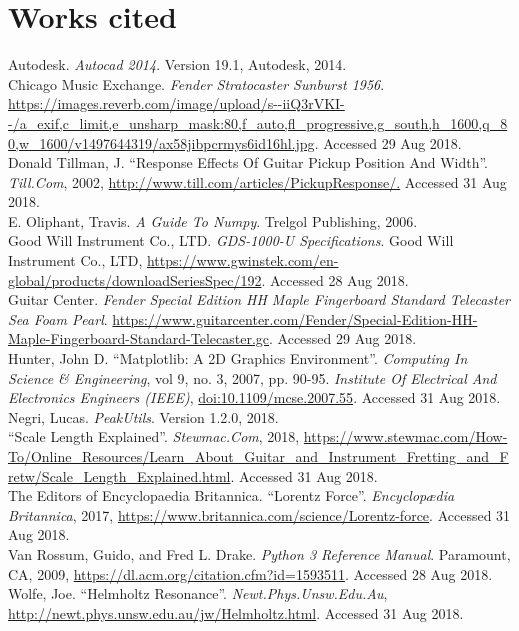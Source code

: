 \documentclass{article}
\begin{document}
\section*{Works cited}
\begin{hangparas}{.25in}{1}
Autodesk. \textit{Autocad 2014}. Version 19.1, Autodesk, 2014.\\

Chicago Music Exchange. \textit{Fender Stratocaster Sunburst 1956}. \url{https://images.reverb.com/image/upload/s--iiQ3rVKI--/a_exif,c_limit,e_unsharp_mask:80,f_auto,fl_progressive,g_south,h_1600,q_80,w_1600/v1497644319/ax58jibpcrmys6id16hl.jpg}. Accessed 29 Aug 2018.\\

Donald Tillman, J. ``Response Effects Of Guitar Pickup Position And Width''. 
\textit{Till.Com}, 2002, \url{http://www.till.com/articles/PickupResponse/.} 
Accessed 31 Aug 2018.\\

E. Oliphant, Travis. \textit{A Guide To Numpy}. Trelgol Publishing, 2006.\\

Good Will Instrument Co., LTD. \textit{GDS-1000-U Specifications}. Good Will 
Instrument Co., LTD, 
\url{https://www.gwinstek.com/en-global/products/downloadSeriesSpec/192}. 
Accessed 28 Aug 2018.\\

Guitar Center. \textit{Fender Special Edition HH Maple Fingerboard Standard 
Telecaster Sea Foam Pearl}. \url{https://www.guitarcenter.com/Fender/Special-Edition-HH-Maple-Fingerboard-Standard-Telecaster.gc}. Accessed 29 Aug 2018.\\

Hunter, John D. ``Matplotlib: A 2D Graphics Environment''. \textit{Computing 
In Science \& Engineering}, vol 9, no. 3, 2007, pp. 90-95. \textit{Institute 
Of Electrical And Electronics Engineers (IEEE)}, 
\url{doi:10.1109/mcse.2007.55}. Accessed 31 Aug 2018.\\

Negri, Lucas. \textit{PeakUtils}. Version 1.2.0, 2018.\\

``Scale Length Explained''. \textit{Stewmac.Com}, 2018, 
\url{https://www.stewmac.com/How-To/Online_Resources/Learn_About_Guitar_and_Instrument_Fretting_and_Fretw/Scale_Length_Explained.html}. Accessed 31 Aug 2018.\\

The Editors of Encyclopaedia Britannica. ``Lorentz Force''. 
\textit{Encyclopædia Britannica}, 2017, 
\url{https://www.britannica.com/science/Lorentz-force}. Accessed 31 Aug 2018.\\

Van Rossum, Guido, and Fred L. Drake. \textit{Python 3 Reference Manual}. 
Paramount, CA, 2009, \url{https://dl.acm.org/citation.cfm?id=1593511}. 
Accessed 28 Aug 2018.\\

Wolfe, Joe. ``Helmholtz Resonance''. \textit{Newt.Phys.Unsw.Edu.Au}, 
\url{http://newt.phys.unsw.edu.au/jw/Helmholtz.html}. Accessed 31 Aug 2018.\\

\end{hangparas}
\end{document}
